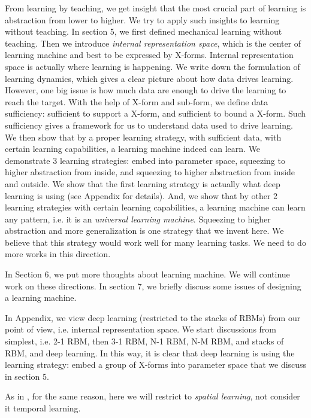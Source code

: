 From learning by teaching, we get insight that the most crucial part of learning is abstraction from lower to higher. We try to apply such insights to learning without teaching. In section 5, we first defined mechanical learning without teaching. Then we introduce {\it internal representation space}, which is the center of learning machine and best to be expressed by X-forms. Internal representation space is actually where learning is happening. We write down the formulation of learning dynamics, which gives a clear picture about how data drives learning. However, one big issue is how much data are enough to drive the learning to reach the target. With the help of X-form and sub-form, we define data sufficiency: sufficient to support a X-form, and sufficient to bound a X-form. Such sufficiency gives a framework for us to understand data used to drive learning. We then show that by a proper learning strategy, with sufficient data, with certain learning capabilities, a learning machine indeed  can learn. We demonstrate 3 learning strategies: embed into parameter space, squeezing to higher abstraction from inside, and squeezing to higher abstraction from inside and outside. We show that the first learning strategy is actually what deep learning is using (see Appendix for details).  And, we show that by other 2 learning strategies with certain learning capabilities, a learning machine can learn any pattern, i.e. it is an {\it universal learning machine}. Squeezing to higher abstraction and more generalization is one strategy that we invent here. We believe that this strategy would work well for many learning tasks. We need to do more works in this direction.

In Section 6, we put more thoughts about learning machine. We will continue work on these directions. In section 7, we briefly discuss some issues of designing a learning machine. 

In Appendix, we view deep learning (restricted to the stacks of RBMs) from our point of view, i.e. internal representation space. We start discussions from simplest, i.e. 2-1 RBM, then 3-1 RBM, N-1 RBM, N-M RBM, and stacks of RBM, and deep learning. In this way, it is clear that deep learning is using the learning strategy: embed a group of X-forms into parameter space that we discuss in section 5. 

As in \cite{paper1}, for the same reason, here we will restrict to {\it spatial learning}, not consider {it temporal learning}.
